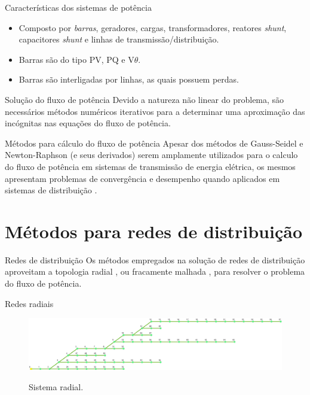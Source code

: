 \documentclass[10pt]{beamer}
\begin{document}
\begin{frame}{Características dos sistemas de potência}
    \begin{itemize}
        \item Composto por \emph{barras}, geradores, cargas, transformadores, reatores \textit{shunt}, capacitores \textit{shunt} e linhas de transmissão/distribuição.
        
        \item Barras são do tipo PV, PQ e V$\theta$.
        
        \item Barras são interligadas por linhas, as quais possuem perdas.
    \end{itemize}
\end{frame}

\begin{frame}{Solução do fluxo de potência}
    \justify
    Devido a natureza não linear do problema, são necessários métodos numéricos iterativos para a determinar uma aproximação das incógnitas nas equações do fluxo de potência.
\end{frame}


\begin{frame}{Métodos para cálculo do fluxo de potência}
    \justify
    Apesar dos métodos de Gauss-Seidel e Newton-Raphson (e seus derivados) serem amplamente utilizados para o calculo do fluxo de potência em sistemas de transmissão de energia elétrica, os mesmos apresentam problemas de convergência e desempenho quando aplicados em sistemas de distribuição \cite{Eminoglu, Alsaadi, Reddy, Yao}.
\end{frame}

\section{Métodos para redes de distribuição}

\begin{frame}{Redes de distribuição}
    Os métodos empregados na solução de redes de distribuição aproveitam a topologia radial \cite{Cespedes}, ou fracamente malhada \cite{ShirmohammadiMono, Shirmohammadi3F}, para resolver o problema do fluxo de potência.
\end{frame}

\begin{frame}{Redes radiais}
\begin{figure}[H]
   \centering
   \caption{Sistema radial.}
   \includegraphics[scale=0.2]{img/70b}
   \label{fig:70b}
\end{figure}
\end{frame}
\end{document}
